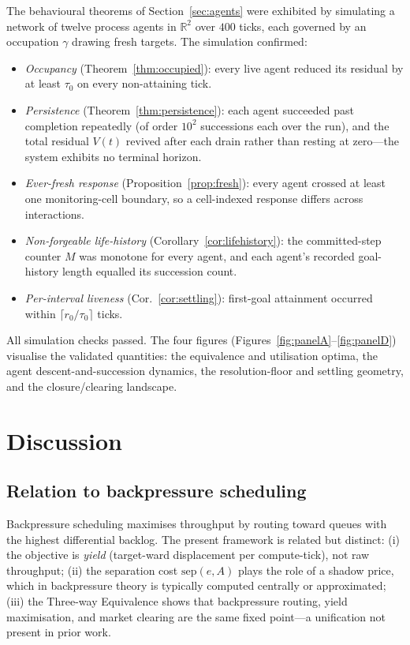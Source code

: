 \documentclass[11pt,twocolumn,a4paper]{article}
\theoremstyle{plain}
\theoremstyle{definition}
\theoremstyle{remark}
\newcommand{\R}{\mathbb{R}}
\newcommand{\tick}{\tau_0}
\newcommand{\sep}{\mathrm{sep}}
\begin{document}
The behavioural theorems of Section~\ref{sec:agents} were exhibited by
simulating a network of twelve process agents in $\R^2$ over $400$
ticks, each governed by an occupation $\gamma$ drawing fresh targets.
The simulation confirmed:
\begin{itemize}[nosep]
\item \emph{Occupancy} (Theorem~\ref{thm:occupied}): every live agent
  reduced its residual by at least $\tick$ on every non-attaining tick.
\item \emph{Persistence} (Theorem~\ref{thm:persistence}): each agent
  succeeded past completion repeatedly (of order $10^2$ successions
  each over the run), and the total residual $V(t)$ revived after each
  drain rather than resting at zero---the system exhibits no terminal
  horizon.
\item \emph{Ever-fresh response} (Proposition~\ref{prop:fresh}): every
  agent crossed at least one monitoring-cell boundary, so a
  cell-indexed response differs across interactions.
\item \emph{Non-forgeable life-history}
  (Corollary~\ref{cor:lifehistory}): the committed-step counter $M$ was
  monotone for every agent, and each agent's recorded goal-history
  length equalled its succession count.
\item \emph{Per-interval liveness} (Cor.~\ref{cor:settling}):
  first-goal attainment occurred within $\lceil r_0/\tick\rceil$ ticks.
\end{itemize}
All simulation checks passed. The four figures
(Figures~\ref{fig:panelA}--\ref{fig:panelD}) visualise the validated
quantities: the equivalence and utilisation optima, the agent
descent-and-succession dynamics, the resolution-floor and settling
geometry, and the closure/clearing landscape.





\section{Discussion}
\label{sec:discussion}

\subsection{Relation to backpressure scheduling}

Backpressure scheduling \cite{tassiulas1992,neely2010} maximises throughput by routing toward queues with the highest differential backlog. The present framework is related but distinct: (i) the objective is \emph{yield} (target-ward displacement per compute-tick), not raw throughput; (ii) the separation cost $\sep(e, A)$ plays the role of a shadow price, which in backpressure theory is typically computed centrally or approximated; (iii) the Three-way Equivalence shows that backpressure routing, yield maximisation, and market clearing are the same fixed point---a unification not present in prior work.
\end{document}
